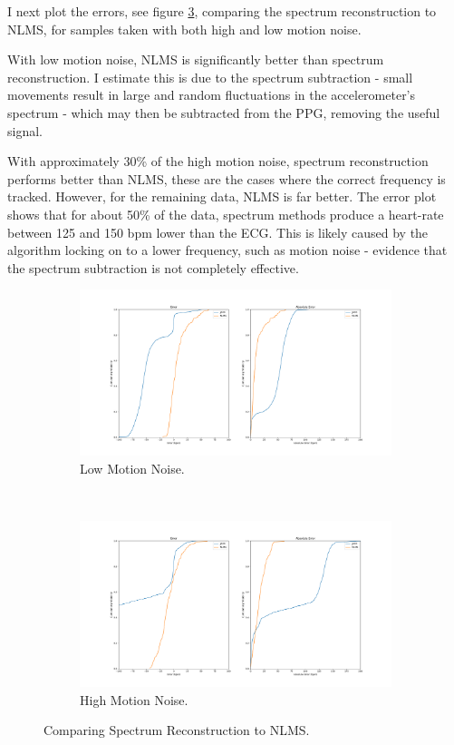 \documentclass[12pt,a4paper,twoside,openany]{report}
\begin{document}
I next plot the errors, see figure \ref{fig:joss_nlms}, comparing the spectrum
reconstruction to NLMS, for samples taken with both high and low motion noise. 

With low motion noise, NLMS is significantly better than spectrum
reconstruction. I estimate this is due to the spectrum subtraction - small
movements result in large and random fluctuations in the accelerometer's
spectrum - which may then be subtracted from the PPG, removing the useful
signal. 

With approximately 30\% of the high motion noise, spectrum reconstruction
performs better than NLMS, these are the cases where the correct frequency is
tracked. However, for the remaining data, NLMS is far better. The error plot
shows that for about 50\% of the data, spectrum methods produce a heart-rate between
125 and 150 bpm lower than the ECG. This is likely caused by the algorithm
locking on to a lower frequency, such as motion noise - evidence that the
spectrum subtraction is not completely effective.

\begin{figure}[H]
\centering
\begin{subfigure}{.85\textwidth}
  \centering
  \includegraphics[width=\linewidth]{figs/joss_nlms_low.png}
  \caption{Low Motion Noise.}
  \label{fig:joss_nlms_low}
\end{subfigure}
\\
\begin{subfigure}{.85\textwidth}
  \centering
  \includegraphics[width=\linewidth]{figs/joss_nlms_medium.png}
  \caption{High Motion Noise.}
  \label{fig:joss_nlms_medium}
\end{subfigure}
\caption{Comparing Spectrum Reconstruction to NLMS.}
\label{fig:joss_nlms}
\end{figure}
\end{document}
